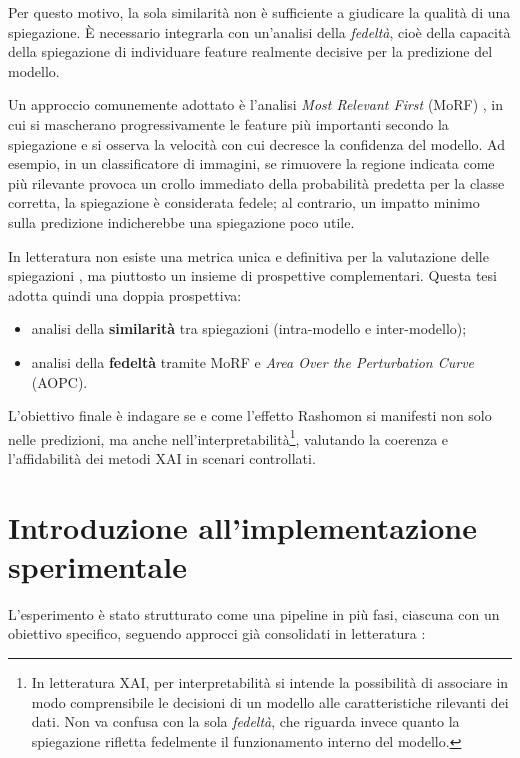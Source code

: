 \documentclass[12pt,a4paper,oneside]{report}
\numberwithin{figure}{chapter}
\numberwithin{table}{chapter}
\begin{document}
Per questo motivo, la sola similarità non è sufficiente a giudicare la qualità
di una spiegazione. È necessario integrarla con un’analisi della
\emph{fedeltà}, cioè della capacità della spiegazione di individuare feature
realmente decisive per la predizione del modello.

Un approccio comunemente adottato è l’analisi \emph{Most Relevant First} (MoRF)
\cite{samek2016evaluating}, in cui si mascherano progressivamente le feature
più importanti secondo la spiegazione e si osserva la velocità con cui decresce
la confidenza del modello. Ad esempio, in un classificatore di immagini, se
rimuovere la regione indicata come più rilevante provoca un crollo immediato
della probabilità predetta per la classe corretta, la spiegazione è considerata
fedele; al contrario, un impatto minimo sulla predizione indicherebbe una
spiegazione poco utile.

In letteratura non esiste una metrica unica e definitiva per la valutazione
delle spiegazioni \cite{adadi2018survey}, ma piuttosto un insieme di
prospettive complementari. Questa tesi adotta quindi una doppia prospettiva:
\begin{itemize}
      \item analisi della \textbf{similarità} tra spiegazioni (intra-modello e
            inter-modello);
      \item analisi della \textbf{fedeltà} tramite MoRF e \emph{Area Over the Perturbation
                  Curve} (AOPC).
\end{itemize}

L’obiettivo finale è indagare se e come l’effetto Rashomon si manifesti non
solo nelle predizioni, ma anche nell’interpretabilità\footnote{In letteratura
      XAI, per interpretabilità si intende la possibilità di associare in modo
      comprensibile le decisioni di un modello alle caratteristiche rilevanti dei
      dati. Non va confusa con la sola \emph{fedeltà}, che riguarda invece quanto la
      spiegazione rifletta fedelmente il funzionamento interno del modello.},
valutando la coerenza e l’affidabilità dei metodi XAI in scenari controllati.

\chapter{Introduzione all’implementazione sperimentale}

L’esperimento è stato strutturato come una pipeline in più fasi, ciascuna con
un obiettivo specifico, seguendo approcci già consolidati in letteratura
\citep{mueller2023rashomon,leventi2023consistency,adadi2018survey}:
\end{document}
